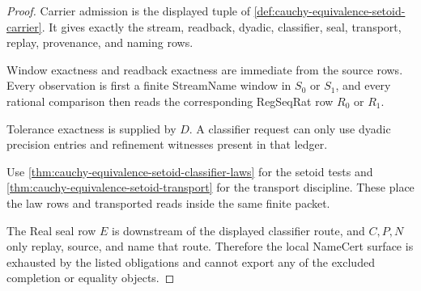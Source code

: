 \begin{proof}
Carrier admission is the displayed tuple of \autoref{def:cauchy-equivalence-setoid-carrier}. It gives exactly the stream, readback, dyadic, classifier, seal, transport, replay, provenance, and naming rows.

Window exactness and readback exactness are immediate from the source rows. Every observation is first a finite StreamName window in $S_0$ or $S_1$, and every rational comparison then reads the corresponding RegSeqRat row $R_0$ or $R_1$.

Tolerance exactness is supplied by $D$. A classifier request can only use dyadic precision entries and refinement witnesses present in that ledger.

Use \autoref{thm:cauchy-equivalence-setoid-classifier-laws} for the setoid tests and \autoref{thm:cauchy-equivalence-setoid-transport} for the transport discipline. These place the law rows and transported reads inside the same finite packet.

The Real seal row $E$ is downstream of the displayed classifier route, and $C,P,N$ only replay, source, and name that route. Therefore the local NameCert surface is exhausted by the listed obligations and cannot export any of the excluded completion or equality objects.
\end{proof}

